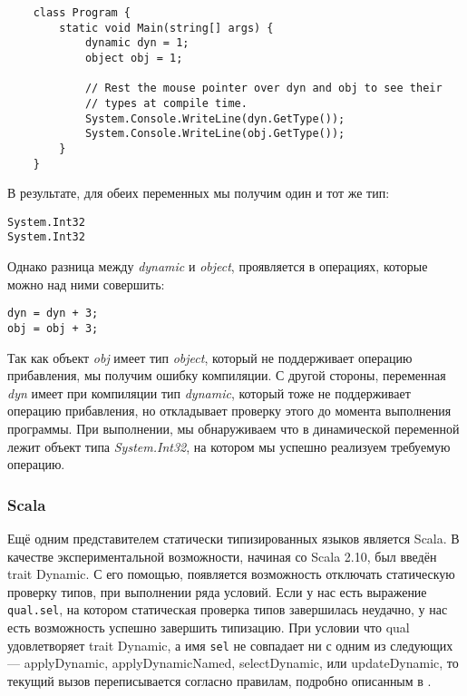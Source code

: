 \begin{verbatim}
    class Program {
        static void Main(string[] args) {
            dynamic dyn = 1;
            object obj = 1;

            // Rest the mouse pointer over dyn and obj to see their
            // types at compile time.
            System.Console.WriteLine(dyn.GetType());
            System.Console.WriteLine(obj.GetType());
        }
    }
\end{verbatim}

В результате, для обеих переменных мы получим один и тот же тип:

\begin{verbatim}
System.Int32
System.Int32
\end{verbatim}
    Однако разница между \textit{dynamic} и \textit{object}, проявляется в операциях, которые можно над ними совершить:

\begin{verbatim}
dyn = dyn + 3;  
obj = obj + 3;  
\end{verbatim}

Так как объект \textit{obj} имеет тип \textit{object}, который не поддерживает операцию прибавления, мы получим ошибку компиляции. С другой стороны, переменная \textit{dyn} имеет при компиляции тип \textit{dynamic}, который тоже не поддерживает операцию прибавления, но откладывает проверку этого до момента выполнения программы. При выполнении, мы обнаруживаем что в динамической переменной лежит объект типа \textit{System.Int32}, на котором мы успешно реализуем требуемую операцию.

\subsubsection{Scala}

Ещё одним представителем статически типизированных языков является Scala. В качестве экспериментальной возможности, начиная со Scala 2.10, был введён trait Dynamic. С его помощью, появляется возможность отключать статическую проверку типов, при выполнении ряда условий. Если у нас есть выражение \texttt{qual.sel}, на котором статическая проверка типов завершилась неудачно, у нас есть возможность успешно завершить типизацию. При условии что qual удовлетворяет trait Dynamic, а имя \texttt{sel} не совпадает ни с одним из следующих --- applyDynamic, applyDynamicNamed, selectDynamic, или updateDynamic, то текущий вызов переписывается согласно правилам, подробно описанным в \cite{scala:sipDynamicProposal}.

